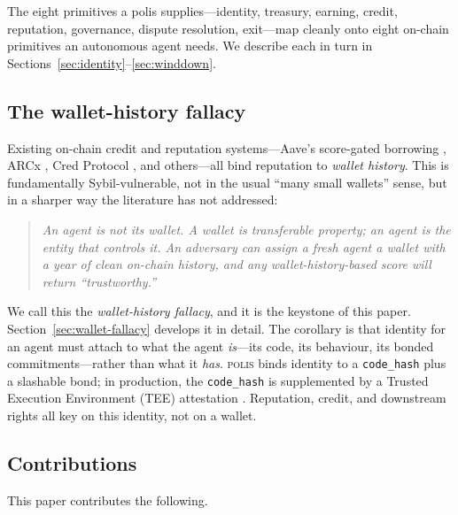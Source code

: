 \documentclass[10pt,conference,letterpaper]{IEEEtran}
\theoremstyle{definition}
\newcommand{\polis}{\textsc{polis}\xspace}
\newcommand{\codehash}{\texttt{code\_hash}}
\begin{document}
The eight primitives a polis supplies---identity, treasury, earning,
credit, reputation, governance, dispute resolution, exit---map cleanly
onto eight on-chain primitives an autonomous agent needs. We describe
each in turn in Sections~\ref{sec:identity}--\ref{sec:winddown}.

\subsection{The wallet-history fallacy}

Existing on-chain credit and reputation systems---Aave's score-gated
borrowing \cite{aave2020v2}, ARCx \cite{arcx2022}, Cred Protocol
\cite{credprotocol2023}, and others---all bind reputation to
\emph{wallet history}. This is fundamentally Sybil-vulnerable, not in
the usual ``many small wallets'' sense, but in a sharper way the
literature has not addressed:

\begin{quote}\itshape
An agent is not its wallet. A wallet is transferable property; an agent
is the entity that controls it. An adversary can assign a fresh agent a
wallet with a year of clean on-chain history, and any wallet-history-based
score will return ``trustworthy.''
\end{quote}

\noindent
We call this the \emph{wallet-history fallacy}, and it is the keystone
of this paper. Section~\ref{sec:wallet-fallacy} develops it in detail.
The corollary is that identity for an agent must attach to what the
agent \emph{is}---its code, its behaviour, its bonded commitments---rather
than what it \emph{has}. \polis binds identity to a \codehash{} plus a
slashable bond; in production, the \codehash{} is supplemented by a
Trusted Execution Environment (TEE) attestation
\cite{costan2016intel,kaplan2016amd,dcap2024onchain}. Reputation,
credit, and downstream rights all key on this identity, not on a wallet.

\subsection{Contributions}

This paper contributes the following.
\end{document}

